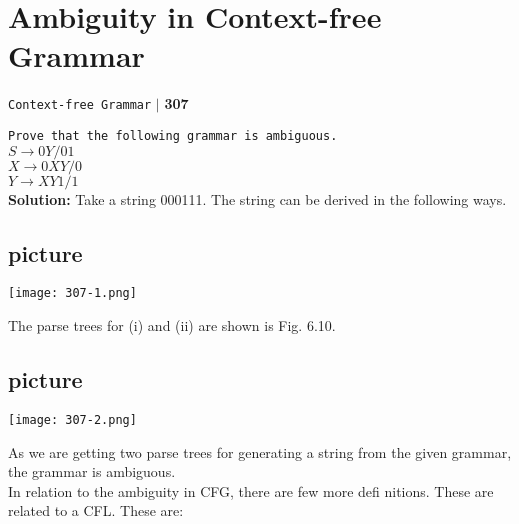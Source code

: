 \documentclass[9pt]{beamer}
\begin{document}
\begin{frame}
\section*{Ambiguity in Context-free Grammar }
\begin{flushright}
 \texttt{Context-free Grammar} \hspace*{0.10cm}\textbf{$|$} \textbf{307}\hspace*{0.5cm}
\end{flushright}

\vspace*{0.5cm}
\hspace*{0.1cm} \texttt{Prove that the following grammar is ambiguous.}\\

\hspace*{4cm} $S \rightarrow 0Y/01$ \\
\hspace*{4cm} $X \rightarrow 0XY/0$ \\
\hspace*{4cm} $Y \rightarrow XY1/1$ \\

\vspace*{0.5cm}
\textbf{Solution: }Take a string 000111. The string can be derived in the following ways.\\

\vspace*{0.3cm}
\begin{flushleft}
  \section{picture}
\texttt{[image: 307-1.png]}
\end{flushleft}
\end{frame}

\begin{frame}
The parse trees for (i) and (ii) are shown is Fig. 6.10.\\

\begin{center}
\section{picture}
\texttt{[image: 307-2.png]}
\end{center}

\hspace*{0.5cm} As we are getting two parse trees for generating a string from the given grammar, the grammar is
ambiguous.\\
\hspace*{0.5cm} In relation to the ambiguity in CFG, there are few more defi nitions. These are related to a CFL.
These are:\\

\vspace*{0.3cm}
\end{frame}
\end{document}
